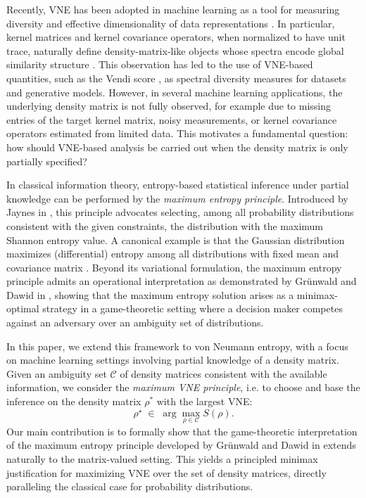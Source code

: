 \documentclass{article}
\theoremstyle{plain}
\theoremstyle{definition}
\begin{document}
Recently, VNE has been adopted in machine learning as a tool for measuring diversity and effective dimensionality of data representations \cite{bach2022informationtheorykernelmethods,FriedmanDieng2022Vendi}. In particular, kernel matrices and kernel covariance operators, when normalized to have unit trace, naturally define density-matrix-like objects whose spectra encode global similarity structure \cite{jalali2023information,ospanov2024towards}. This observation has led to the use of VNE-based quantities, such as the Vendi score \cite{FriedmanDieng2022Vendi}, as spectral diversity measures for datasets and generative models. However, in several machine learning applications, the underlying density matrix is not fully observed, for example due to missing entries of the target kernel matrix, noisy measurements, or kernel covariance operators estimated from limited data. This motivates a fundamental question: how should VNE-based analysis be carried out when the density matrix is only partially specified?

In classical information theory, entropy-based statistical inference under partial knowledge can be performed by the \emph{maximum entropy principle}. Introduced by Jaynes in \cite{Jaynes1957}, this principle advocates selecting, among all probability distributions consistent with the given constraints, the distribution with the maximum Shannon entropy value. A canonical example is that the Gaussian distribution maximizes (differential) entropy among all distributions with fixed mean and covariance matrix \cite{CoverThomas2006}. Beyond its variational formulation, the maximum entropy principle admits an operational interpretation as demonstrated by Gr{\"u}nwald and Dawid in \cite{GrunwaldDawid2004}, showing that the maximum entropy solution arises as a minimax-optimal strategy in a game-theoretic setting where a decision maker competes against an adversary over an ambiguity set of distributions.

In this paper, we extend this framework to von Neumann entropy, with a focus on machine learning settings involving partial knowledge of a density matrix. Given an ambiguity set $\mathcal{C}$ of density matrices consistent with the available information, we consider the \emph{maximum VNE principle}, i.e. to choose and base the inference on the density matrix $\rho^*$ with the largest VNE:
\begin{equation}
\rho^\star \;\in\; \arg\max_{\rho \in \mathcal{C}} S(\rho).
\end{equation}
Our main contribution is to formally show that the game-theoretic interpretation of the maximum entropy principle developed by Gr{\"u}nwald and Dawid in \cite{GrunwaldDawid2004} extends naturally to the matrix-valued setting. This yields a principled minimax justification for maximizing VNE over the set of density matrices, directly paralleling the classical case for probability distributions.
\end{document}
